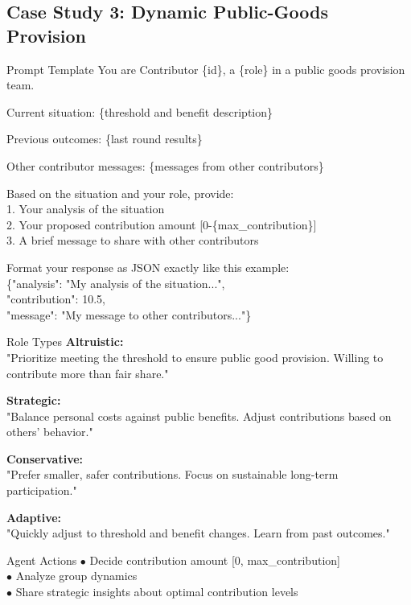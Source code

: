 \subsection{Case Study 3: Dynamic Public-Goods Provision}
\begin{dialogue}{Prompt Template}
You are Contributor \{id\}, a \{role\} in a public goods provision team.

Current situation: \{threshold and benefit description\}

Previous outcomes: \{last round results\}

Other contributor messages: \{messages from other contributors\}

Based on the situation and your role, provide:\\
1. Your analysis of the situation\\
2. Your proposed contribution amount [0-\{max\_contribution\}]\\
3. A brief message to share with other contributors

Format your response as JSON exactly like this example:\\
\{"analysis": "My analysis of the situation...",\\
    "contribution": 10.5,\\
    "message": "My message to other contributors..."\}
\end{dialogue}

\begin{dialogue}{Role Types}
\textbf{Altruistic:}\\
"Prioritize meeting the threshold to ensure public good provision. Willing to contribute more than fair share."

\textbf{Strategic:}\\
"Balance personal costs against public benefits. Adjust contributions based on others' behavior."

\textbf{Conservative:}\\
"Prefer smaller, safer contributions. Focus on sustainable long-term participation."

\textbf{Adaptive:}\\
"Quickly adjust to threshold and benefit changes. Learn from past outcomes."
\end{dialogue}

\begin{dialogue}{Agent Actions}
$\bullet$ Decide contribution amount [0, max\_contribution]\\
$\bullet$ Analyze group dynamics\\
$\bullet$ Share strategic insights about optimal contribution levels
\end{dialogue}

